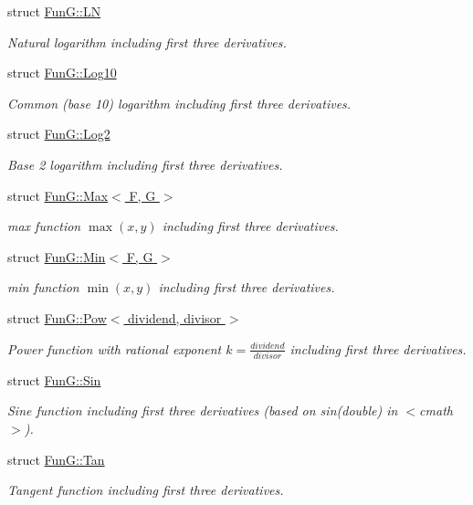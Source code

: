 \begin{DoxyCompactItemize}
struct \hyperlink{structFunG_1_1LN}{Fun\+G\+::\+LN}
\begin{DoxyCompactList}\small\item\em Natural logarithm including first three derivatives. \end{DoxyCompactList}\item 
struct \hyperlink{structFunG_1_1Log10}{Fun\+G\+::\+Log10}
\begin{DoxyCompactList}\small\item\em Common (base 10) logarithm including first three derivatives. \end{DoxyCompactList}\item 
struct \hyperlink{structFunG_1_1Log2}{Fun\+G\+::\+Log2}
\begin{DoxyCompactList}\small\item\em Base 2 logarithm including first three derivatives. \end{DoxyCompactList}\item 
struct \hyperlink{structFunG_1_1Max}{Fun\+G\+::\+Max$<$ F, G $>$}
\begin{DoxyCompactList}\small\item\em max function $ \max(x,y) $ including first three derivatives. \end{DoxyCompactList}\item 
struct \hyperlink{structFunG_1_1Min}{Fun\+G\+::\+Min$<$ F, G $>$}
\begin{DoxyCompactList}\small\item\em min function $ \min(x,y) $ including first three derivatives. \end{DoxyCompactList}\item 
struct \hyperlink{structFunG_1_1Pow}{Fun\+G\+::\+Pow$<$ dividend, divisor $>$}
\begin{DoxyCompactList}\small\item\em Power function with rational exponent $ k = \frac{dividend}{divisor} $ including first three derivatives. \end{DoxyCompactList}\item 
struct \hyperlink{structFunG_1_1Sin}{Fun\+G\+::\+Sin}
\begin{DoxyCompactList}\small\item\em Sine function including first three derivatives (based on sin(double) in $<$cmath$>$). \end{DoxyCompactList}\item 
struct \hyperlink{structFunG_1_1Tan}{Fun\+G\+::\+Tan}
\begin{DoxyCompactList}\small\item\em Tangent function including first three derivatives. \end{DoxyCompactList}\end{DoxyCompactItemize}

